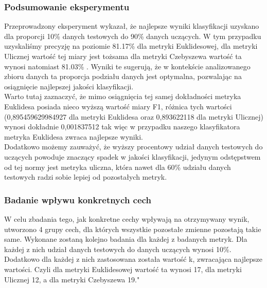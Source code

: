 \documentclass{article}
\begin{document}




\subsubsection*{Podsumowanie eksperymentu}

\noindent Przeprowadzony eksperyment wykazał, że najlepsze wyniki klasyfikacji uzyskano dla proporcji 10\% danych testowych do 90\% danych uczących. W tym przypadku uzyskaliśmy precyzję na poziomie 81.17\% dla metryki Euklidesowej, dla metryki Ulicznej wartość tej miary jest tożsama dla metryki Czebyszewa wartość ta wynosi natomiast 81.03\% . Wyniki te sugerują, że w kontekście analizowanego zbioru danych ta proporcja podziału danych jest optymalna, pozwalając na osiągnięcie najlepszej jakości klasyfikacji. \\

\noindent Warto tutaj zaznaczyć, że mimo osiągnięcia tej samej dokładności metryka Euklidesa posiada nieco wyższą wartość miary F1, różnica tych wartości \\ (0,895459629984927 dla metryki Euklidesa oraz 0,893622118 dla metryki Ulicznej) wynosi dokładnie 0,001837512 tak więc w przypadku naszego klasyfikatora metryka Euklidesa zwraca najlepsze wyniki. \\

\noindent Dodatkowo możemy zauważyć, że wyższy procentowy udział danych testowych do uczących powoduje znaczący spadek w jakości klasyfikacji, jedynym odstępstwem od tej normy jest metryka uliczna, która nawet dla 60\% udziału danych testowych radzi sobie lepiej od pozostałych metryk. \\


\subsubsection*{Badanie wpływu konkretnych cech}

\noindent W celu zbadania tego, jak konkretne cechy wpływają na otrzymywany wynik, utworzono 4 grupy cech, dla których wszystkie pozostałe zmienne pozostają takie same. Wykonane zostaną kolejno badania dla każdej z badanych metryk. Dla każdej z nich udział danych testowych do danych uczących wynosi 10\%. Dodatkowo dla każdej z nich zastosowana została wartość k, zwracająca najlepsze wartości. Czyli dla metryki Euklidesowej wartość ta wynosi 17, dla metryki Ulicznej 12, a dla metryki Czebyszewa 19." \\
\end{document}
